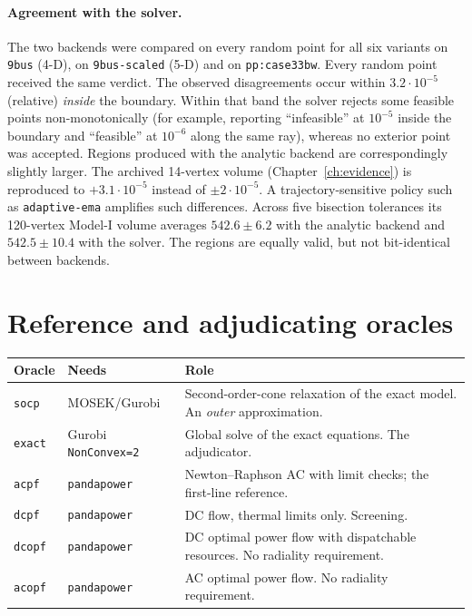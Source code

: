\documentclass[11pt,a4paper]{report}
\newcommand{\code}[1]{\texttt{\small #1}}
\begin{document}
\paragraph{Agreement with the solver.} The two backends were compared on every
random point for all six variants on \code{9bus} (4-D), on \code{9bus-scaled}
(5-D) and on \code{pp:case33bw}. Every random point
received the same verdict. The observed disagreements occur within $3.2\cdot10^{-5}$
(relative) \emph{inside} the boundary. Within that band the solver rejects some
feasible points non-monotonically (for example, reporting ``infeasible'' at
$10^{-5}$ inside the boundary and ``feasible'' at $10^{-6}$ along the same ray),
whereas no exterior point was accepted. Regions produced with the analytic
backend are correspondingly slightly larger. The
archived 14-vertex volume (Chapter~\ref{ch:evidence}) is reproduced to
$+3.1\cdot10^{-5}$ instead of $\pm2\cdot10^{-5}$. A trajectory-sensitive
policy such as \code{adaptive-ema} amplifies such differences. Across five
bisection tolerances its 120-vertex Model-I volume averages
$542.6 \pm 6.2$ with the analytic backend and $542.5 \pm 10.4$ with the
solver. The regions are equally valid, but not bit-identical between backends.

\section{Reference and adjudicating oracles}

\begin{center}\small
\begin{tabular}{@{}llp{7.4cm}@{}}
\toprule
Oracle & Needs & Role \\
\midrule
\code{socp}  & MOSEK/Gurobi & Second-order-cone relaxation of the exact model.
  An \emph{outer} approximation. \\
\code{exact} & Gurobi \code{NonConvex=2} & Global solve of the exact equations.
  The adjudicator. \\
\code{acpf}  & \code{pandapower} & Newton--Raphson AC with limit checks; the
  first-line reference. \\
\code{dcpf}  & \code{pandapower} & DC flow, thermal limits only. Screening. \\
\code{dcopf} & \code{pandapower} & DC optimal power flow with dispatchable
  resources. No radiality requirement. \\
\code{acopf} & \code{pandapower} & AC optimal power flow. No radiality
  requirement. \\
\bottomrule
\end{tabular}
\end{center}
\end{document}

